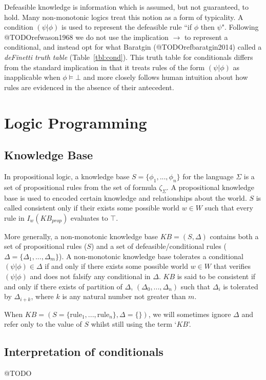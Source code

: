 Defeasible knowledge is information which is assumed, but not guaranteed, to hold. Many non-monotonic logics treat this notion as a form of typicality. A condition $(\psi|\phi)$ is used to represent the defeasible rule ``if $\phi$ then $\psi$". Following @TODOrefwason1968 we do not use the implication $\rightarrow$ to represent a conditional, and instead opt for what Baratgin (@TODOrefbaratgin2014) called a \textit{deFinetti truth table} (Table~\ref{tbl:cond}). This truth table for conditionals differs from the standard implication in that it treats rules of the form $(\psi|\phi)$ as inapplicable when $\phi \models \bot$ and more closely follows human intuition about how rules are evidenced in the absence of their antecedent.

\section{Logic Programming}
\subsection{Knowledge Base} \label{ssec:kb}
In propositional logic, a knowledge base $S=\{\phi_1,...,\phi_n\}$ for the language $\Sigma$ is a set of propositional rules from the set of formula $\zeta_\Sigma$. A propositional knowledge base is used to encoded certain knowledge and relationships about the world. $S$ is called consistent only if their exists some possible world $w \in W$ such that every rule in $I_w(KB_{prop})$ evaluates to $\top$.

More generally, a non-monotonic knowledge base $KB=(S, \Delta)$ contains both a set of propositional rules ($S$) and a set of defeasible/conditional rules ($\Delta=\{\Delta_1,...,\Delta_m\}$). A non-monotonic knowledge base tolerates a conditional $(\psi|\phi)\in\Delta$ if and only if there exists some possible world $w\in W$ that verifies $(\psi|\phi)$ and does not falsify any conditional in $\Delta$. $KB$ is said to be consistent if and only if there exists of partition of $\Delta$, $(\Delta_0,...,\Delta_n)$ such that $\Delta_i$ is tolerated by $\Delta_{i+k}$, where $k$ is any natural number not greater than $m$. 

When $KB=(S=\{\textrm{rule}_1,...,\textrm{rule}_n\},\Delta=\{\})$, we will sometimes ignore $\Delta$ and refer only to the value of $S$ whilst still using the term `$KB$'.
%
\subsection{Interpretation of conditionals} \label{ssec:condInterpretation}
@TODO



